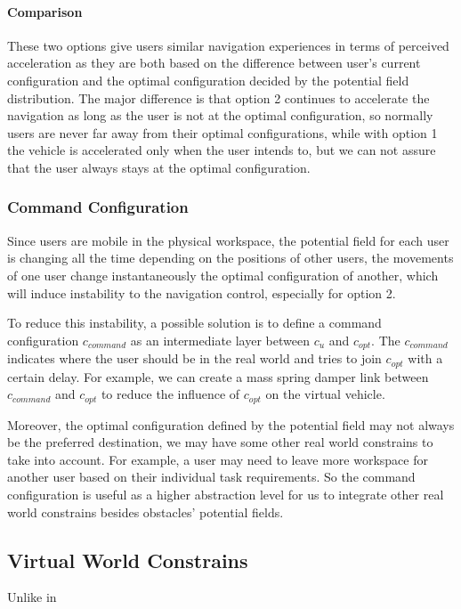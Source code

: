 \paragraph{Comparison}
These two options give users similar navigation experiences in terms of perceived acceleration as they are both based on the difference between user's current configuration and the optimal configuration decided by the potential field distribution. The major difference is that option 2 continues to accelerate the navigation as long as the user is not at the optimal configuration, so normally users are never far away from their optimal configurations, while with option 1 the vehicle is accelerated only when the user intends to, but we can not assure that the user always stays at the optimal configuration.

\subsubsection{Command Configuration}
Since users are mobile in the physical workspace, the potential field for each user is changing all the time depending on the positions of other users, the movements of one user change instantaneously the optimal configuration of another, which will induce instability to the navigation control, especially for option 2.

To reduce this instability, a possible solution is to define a command configuration $c_{command}$ as an intermediate layer between $c_{u}$ and $c_{opt}$. The $c_{command}$ indicates where the user should be in the real world and tries to join $c_{opt}$ with a certain delay. For example, we can create a mass spring damper link between $c_{command}$ and $c_{opt}$ to reduce the influence of $c_{opt}$ on the virtual vehicle.

Moreover, the optimal configuration defined by the potential field may not always be the preferred destination, we may have some other real world constrains to take into account. For example, a user may need to leave more workspace for another user based on their individual task requirements. So the command configuration is useful as a higher abstraction level for us to integrate other real world constrains besides obstacles' potential fields. 


\subsection{Virtual World Constrains}
Unlike in 


